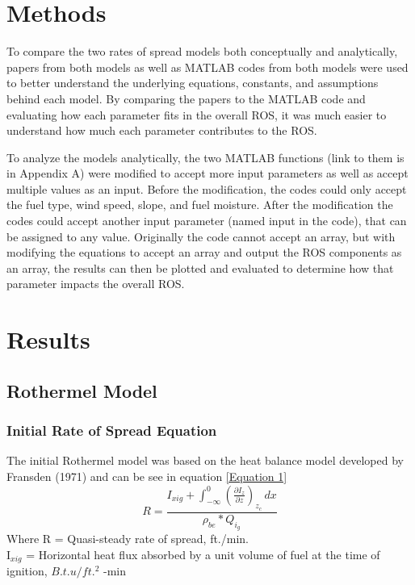 \documentclass{article}
\begin{document}
\section{Methods}
To compare the two rates of spread models both conceptually and analytically, papers from both models as well as MATLAB codes from both models were used to better understand the underlying equations, constants, and assumptions behind each model. By comparing the papers to the MATLAB code and evaluating how each parameter fits in the overall ROS, it was much easier to understand how much each parameter contributes to the ROS. 


To analyze the models analytically, the two MATLAB functions (link to them is in Appendix A) were modified to accept more input parameters as well as accept multiple values as an input. Before the modification, the codes could only accept the fuel type, wind speed, slope, and fuel moisture. After the modification the codes could accept another input parameter (named input in the code), that can be assigned to any value. Originally the code cannot accept an array, but with modifying the equations to accept an array and output the ROS components as an array, the results can then be plotted and evaluated to determine how that parameter impacts the overall ROS. 

\section{Results}
\subsection{Rothermel Model}
\subsubsection{Initial Rate of Spread Equation}

The initial Rothermel model was based on the heat balance model developed by Fransden (1971) and can be see in equation \ref{Equation 1}
\begin{equation}
R = \frac {I_{xig} + \int_{-\infty}^{0} (\frac {\partial I_{z}} {\partial z})_{z_c}\,dx }{\rho_{be} * Q_{i_g}}
\label{Equation 1}
\end{equation}
Where R = Quasi-steady rate of spread, ft./min. \\

\noindent I$_{xig}$ = Horizontal heat flux absorbed by a unit volume of fuel at the time of ignition, $B.t.u/ft.^2$ -min \\
\end{document}

